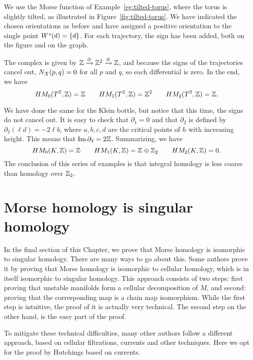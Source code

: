 \begin{eg}
    We use the Morse function of Example~\ref{eg:tilted-torus}, where the torus is slightly tilted, as illustrated in Figure~\ref{fig:tilted-torus}.
    We have indicated the chosen orientations as before and have assigned a positive orientation to the single point $\stable d = \{d\}$.
    For each trajectory, the sign has been added, both on the figure and on the graph.

    The complex is given by $\Z \xrightarrow{\partial} \Z^2 \xrightarrow{\partial}  \Z$, and because the signs of the trajectories cancel out, $\NX Xpq = 0$ for all $p$ and $q$, so each differential is zero.
    In the end, we have
    \[
        \HMf[0]{T^2, \Z} = \Z \qquad
        \HMf[1]{T^2, \Z} = \Z^2 \qquad
        \HMf[2]{T^2, \Z} = \Z
    .\] 
\end{eg}
\begin{eg}
    We have done the same for the Klein bottle, but notice that this time, the signs do not cancel out.
    It is easy to check that $\partial_1 = 0$ and that  $\partial_2$ is defined by  $\partial_2(\ell d) = -2\ell b$, where $a,b,c,d$ are the critical points of $h$ with increasing height.
    This means that $\Im \partial_2 = 2 \Z$. Summarizing, we have
    \[
        \HMf[0]{K, \Z} = \Z \qquad
        \HMf[1]{K, \Z} = \Z \oplus \Z_2 \qquad
        \HMf[2]{K, \Z} = 0
    .\] 
    The conclusion of this series of examples is that integral homology is less coarse than homology over $\Z_2$.
\end{eg}

\section{Morse homology is singular homology}

In the final section of this Chapter, we prove that Morse homology is isomorphic to singular homology.
There are many ways to go about this.
Some authors prove it by proving that Morse homology is isomorphic to cellular homology, which is in itself isomorphic to singular homology.
This approach consists of two steps: first proving that unstable manifolds form a cellular decomposition of $M$, and second: proving that the corresponding map is a chain map isomorphism.
While the first step is intuitive, the proof of it is actually very technical.
The second step on the other hand, is the easy part of the proof.

To mitigate these technical difficulties, many other authors  follow a different approach, based on cellular filtrations, currents and other techniques.
Here we opt for the proof by Hutchings based on currents.

